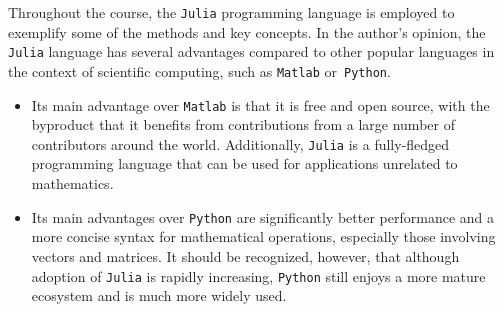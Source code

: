 Throughout the course, the \texttt{Julia} programming language is employed to exemplify some of the methods and key concepts.
In the author's opinion,
the \texttt{Julia} language has several advantages compared to other popular languages in the context of scientific computing,
such as \texttt{Matlab} or~\texttt{Python}.
%
\begin{itemize}
    \item
        Its main advantage over \texttt{Matlab} is that it is free and open source,
        with the byproduct that it benefits from contributions from a large number of contributors around the world.
        Additionally, \texttt{Julia} is a fully-fledged programming language that can be used for applications unrelated to mathematics.

    \item
        Its main advantages over \texttt{Python} are significantly better performance and a more concise syntax for mathematical operations,
        especially those involving vectors and matrices.
        It should be recognized, however, that although adoption of \texttt{Julia} is rapidly increasing,
        \texttt{Python} still enjoys a more mature ecosystem and is much more widely used.
\end{itemize}
